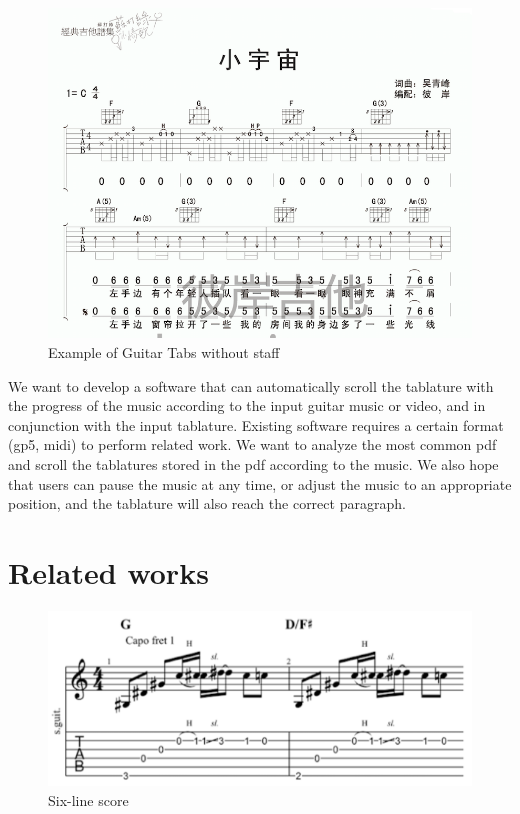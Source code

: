 \documentclass[10pt,twocolumn,letterpaper]{article}
\begin{document}
\begin{CJK}{UTF8}{bsmi}
\begin{figure}[t]
\begin{center}
   \includegraphics[width=0.9\linewidth]{tab2.png}
\end{center}
\caption{Example of Guitar Tabs without staff\cite{small_universe}}
\label{fig:long}
\label{fig:tab2}
\end{figure}

We want to develop a software that can automatically scroll the tablature with the progress of the music according to the input guitar music or video, and in conjunction with the input tablature.
Existing software requires a certain format (gp5, midi) to perform related work. 
We want to analyze the most common pdf and scroll the tablatures stored in the pdf according to the music. 
We also hope that users can pause the music at any time, or adjust the music to an appropriate position, and the tablature will also reach the correct paragraph.

\section{Related works}

\begin{figure}[t]
\begin{center}
   \includegraphics[width=0.8\linewidth]{relate_works_1.png}
\end{center}
   \caption{Six-line score}
\label{fig:relate_works_1}
\end{figure}


\end{CJK}
\end{document}

